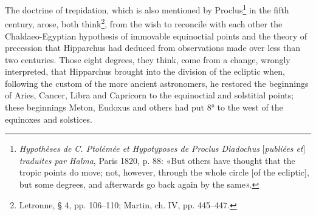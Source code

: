 \documentclass[11pt]{article}
\begin{document}
\par The doctrine of trepidation, which is also mentioned by Proclus\footnote{\emph{Hypothèses de C. Ptolémée et Hypotyposes de Proclus Diadochus} [\emph{publiées et}] \emph{traduites par Halma}, Paris 1820, p. 88: «But others have thought that the tropic points do move; not, however, through the whole circle [of the ecliptic], but some degrees, and afterwards go back again by the same».} in the fifth century, arose, both think\footnote{Letronne, § 4, pp. 106–110; Martin, ch. IV, pp. 445–447.}, from the wish to reconcile with each other the Chaldaeo-Egyptian hypothesis of immovable equinoctial points and the theory of precession that Hipparchus had deduced from observations made over less than two centuries. Those eight degrees, they think, come from a change, wrongly interpreted, that Hipparchus brought into the division of the ecliptic when, following the custom of the more ancient astronomers, he restored the beginnings of Aries, Cancer, Libra and Capricorn to the equinoctial and solstitial points; these beginnings Meton, Eudoxus and others had put 8° to the west of the equinoxes and solstices.\par
\end{document}

